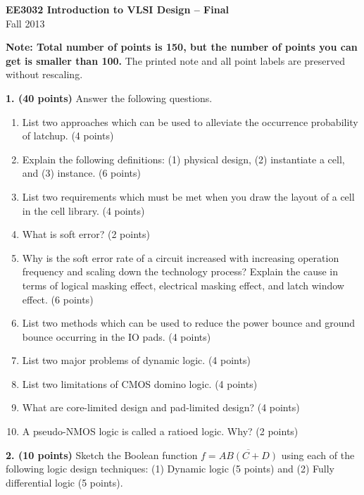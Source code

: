 \documentclass[10pt]{article}
\begin{document}
\begin{center}{\large\bfseries EE3032 Introduction to VLSI Design -- Final}\\Fall 2013\end{center}
\textbf{Note: Total number of points is 150, but the number of points you can get is smaller than 100.} The printed note and all point labels are preserved without rescaling.

\textbf{1. (40 points)} Answer the following questions.
\begin{enumerate}[label=(\alph*),leftmargin=7mm,itemsep=2pt]
\item List two approaches which can be used to alleviate the occurrence probability of latchup. (4 points)
\item Explain the following definitions: (1) physical design, (2) instantiate a cell, and (3) instance. (6 points)
\item List two requirements which must be met when you draw the layout of a cell in the cell library. (4 points)
\item What is soft error? (2 points)
\item Why is the soft error rate of a circuit increased with increasing operation frequency and scaling down the technology process? Explain the cause in terms of logical masking effect, electrical masking effect, and latch window effect. (6 points)
\item List two methods which can be used to reduce the power bounce and ground bounce occurring in the IO pads. (4 points)
\item List two major problems of dynamic logic. (4 points)
\item List two limitations of CMOS domino logic. (4 points)
\item What are core-limited design and pad-limited design? (4 points)
\item A pseudo-NMOS logic is called a ratioed logic. Why? (2 points)
\end{enumerate}
\textbf{2. (10 points)} Sketch the Boolean function $f=\overline{AB(C+D)}$ using each of the following logic design techniques: (1) Dynamic logic (5 points) and (2) Fully differential logic (5 points).
\end{document}
